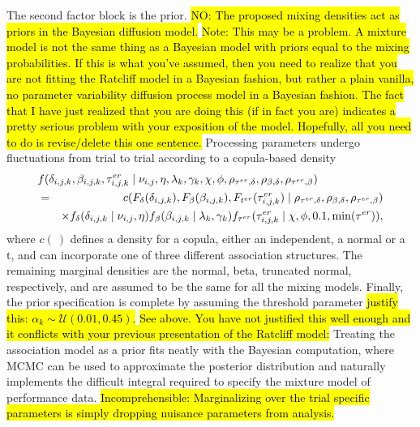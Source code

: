 \documentclass[12pt]{article}
\newcommand{\trish}[1]{\textrm{\hl{#1}}}
\begin{document}
The second factor block is the prior. \trish{NO: The
proposed mixing densities act as priors in the Bayesian diffusion
model.}
%
\trish{Note: This may be a problem.  A mixture model is not the same thing
as a Bayesian model with priors equal to the mixing probabilities.  If
this is what you've assumed, then you need to realize that you are not
fitting the Ratcliff model in a Bayesian fashion, but rather a plain
vanilla, no parameter variability diffusion process model in a
Bayesian fashion.  The fact that I have just realized that you are
doing this (if in fact you are) indicates a pretty serious problem
with your exposition of the model.  Hopefully, all you need to do is
revise/delete this one sentence.}
%
Processing parameters undergo fluctuations from trial to trial
according to a copula-based density
%
\begin{eqnarray}
\lefteqn{f(\delta_{i,j,k},\beta_{i,j,k},\tau_{i,j,k}^{er} 
   \mid \nu_{i,j},\eta,\lambda_k,\gamma_k,\chi,\phi,\rho_{\tau^{er},\delta},
   \rho_{\beta,\delta},\rho_{\tau^{er},\beta})} \nonumber \\
  & = & c(F_{\delta}(\delta_{i,j,k}),F_{\beta}(\beta_{i,j,k}),F_{t^{er}}(\tau_{i,j,k}^{er}) 
        \mid \rho_{\tau^{er},\delta},\rho_{\beta,\delta},\rho_{\tau^{er},\beta}) \nonumber \\
  &   & \times f_{\delta}(\delta_{i,j,k} \mid \nu_{i,j}, \eta)
               f_{\beta}(\beta_{i,j,k} \mid \lambda_k,\gamma_k)
               f_{\tau^{er}}(\tau_{i,j,k}^{er} \mid \chi, \phi, 0.1, \operatorname{min}(\tau^{er})), 
\end{eqnarray} 
%
where $c(\:)$ defines a density for a copula, either an independent, a
normal or a t, and can incorporate one of three different
association structures. The remaining marginal densities are the normal, beta, truncated normal, respectively,
and are assumed to be the same for 
all the mixing models. Finally, the prior specification is complete by
assuming the threshold parameter \trish{justify this:
$ 
\alpha_k \sim \mathcal{U}(0.01, 0.45).  
$
}
\trish{See above.  You have not justified this well enough and it
conflicts with your previous presentation of the Ratcliff model:}
Treating the association model as a prior fits neatly with the
Bayesian computation, where MCMC can be used to approximate the
posterior distribution and naturally implements the difficult integral
required to specify the mixture model of performance
data. \trish{Incomprehensible: Marginalizing over the trial specific
parameters is simply dropping nuisance parameters from analysis.}
    
\end{document}
